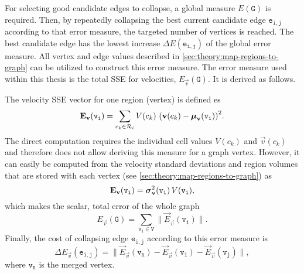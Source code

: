 For selecting good candidate edges to collapse, a global measure $E(\mathtt{G})$ is required. Then, by repeatedly collapsing the best current candidate edge $\mathtt{e_{i,j}}$ according to that error measure, the targeted number of vertices is reached. The best candidate edge has the lowest increase $\Delta E(\mathtt{e_{i,j}})$ of the global error measure. All vertex and edge values described in \autoref{sec:theory:map-regions-to-graph} can be utilized to construct this error measure.
%
The error measure used within this thesis is the total \ac{SSE} for velocities, $E_\vec{v}(\mathtt{G})$. It is derived as follows.


The velocity \ac{SSE} vector for one region (vertex) is defined es
%
\begin{equation}
  \vec{E_{\vec{v}}}(\mathtt{v_i}) =
	  \sum\limits_{c_k\in\mathcal{R}_i}{
	    \normprod{
        V(c_k)
			}{
			  \left( \vec{v}(c_k) - \boldsymbol\mu_\vec{v}(\mathtt{v_i}) \right)^2 
			}
		}.
\end{equation}%
%
The direct computation requires the individual cell values $V(c_k)$ and $\vec{v}(c_k)$ and therefore does not allow deriving this measure for a graph vertex. However, it can easily be computed from the velocity standard deviations and region volumes that are stored with each vertex (see \autoref{sec:theory:map-regions-to-graph}) as
%
\begin{equation}
  \vec{E}_{\vec{v}}(\mathtt{v_i}) =
  \normprod{
    \boldsymbol\sigma^2_\vec{v}(\mathtt{v_i})
   }{
     V(\mathtt{v_i})
   },
\end{equation}
%
which makes the scalar, total error of the whole graph
%
\begin{equation}
  E_{\vec{v}}(\mathtt{G}) = \sum\limits_{\mathtt{v_i}\in\mathtt{V}}{
    \|\vec{E}_{\vec{v}}(\mathtt{v_i})\|
  }.
\end{equation}
%
Finally, the cost of collapsing edge $\mathtt{e_{i,j}}$ according to this error measure is 
\begin{equation}
   \Delta E_\vec{v}(\mathtt{e_{i,j}}) = \|\vec{E}_\vec{v}(\mathtt{v_n}) - \vec{E}_\vec{v}(\mathtt{v_i}) - \vec{E}_\vec{v}(\mathtt{v_j})\|,
\end{equation}
%
where $\mathtt{v_n}$ is the merged vertex.




